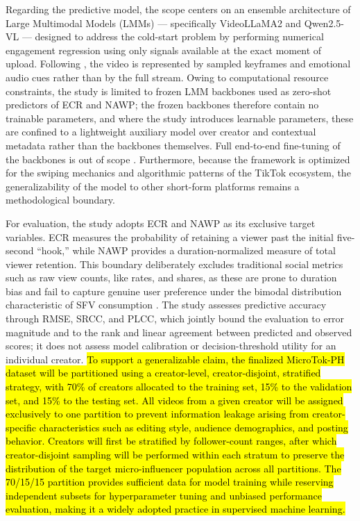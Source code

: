 Regarding the predictive model, the scope centers on an ensemble architecture of Large Multimodal Models (LMMs) — specifically VideoLLaMA2 and Qwen2.5-VL — designed to address the cold-start problem by performing numerical engagement regression using only signals available at the exact moment of upload. Following \cite{sun2025engagement}, the video is represented by sampled keyframes and emotional audio cues rather than by the full stream. Owing to computational resource constraints, the study is limited to frozen LMM backbones used as zero-shot predictors of ECR and NAWP; the frozen backbones therefore contain no trainable parameters, and where the study introduces learnable parameters, these are confined to a lightweight auxiliary model over creator and contextual metadata rather than the backbones themselves. Full end-to-end fine-tuning of the backbones is out of scope \cite{li2025vquala}. Furthermore, because the framework is optimized for the swiping mechanics and algorithmic patterns of the TikTok ecosystem, the generalizability of the model to other short-form platforms remains a methodological boundary.

For evaluation, the study adopts ECR and NAWP as its exclusive target variables. ECR measures the probability of retaining a viewer past the initial five-second ``hook,'' while NAWP provides a duration-normalized measure of total viewer retention. This boundary deliberately excludes traditional social metrics such as raw view counts, like rates, and shares, as these are prone to duration bias and fail to capture genuine user preference under the bimodal distribution characteristic of SFV consumption \cite{sun2025engagement}. The study assesses predictive accuracy through RMSE, SRCC, and PLCC, which jointly bound the evaluation to error magnitude and to the rank and linear agreement between predicted and observed scores; it does not assess model calibration or decision-threshold utility for an individual creator. \hl{To support a generalizable claim, the finalized MicroTok-PH dataset will be partitioned using a creator-level, creator-disjoint, stratified strategy, with 70\% of creators allocated to the training set, 15\% to the validation set, and 15\% to the testing set. All videos from a given creator will be assigned exclusively to one partition to prevent information leakage arising from creator-specific characteristics such as editing style, audience demographics, and posting behavior. Creators will first be stratified by follower-count ranges, after which creator-disjoint sampling will be performed within each stratum to preserve the distribution of the target micro-influencer population across all partitions. The 70/15/15 partition provides sufficient data for model training while reserving independent subsets for hyperparameter tuning and unbiased performance evaluation, making it a widely adopted practice in supervised machine learning.}

